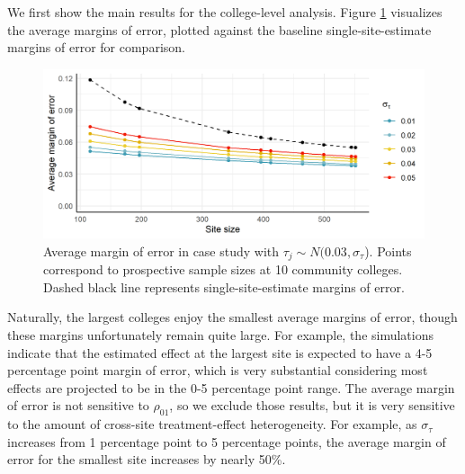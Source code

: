 \documentclass[]{article}
\begin{document}
We first show the main results for the college-level analysis.
Figure \ref{fig:case_study_moe} visualizes the average margins of error, plotted against the baseline single-site-estimate margins of error for comparison.
\begin{figure}[t]
    \centering
    \includegraphics[width=\textwidth]{case_study_moe.png}
    \caption{Average margin of error in case study with $\tau_j \sim N(0.03, \sigma_\tau$). Points correspond to prospective sample sizes at 10 community colleges. Dashed black line represents single-site-estimate margins of error.}
    \label{fig:case_study_moe}
\end{figure}
Naturally, the largest colleges enjoy the smallest average margins of error, though these margins unfortunately remain quite large.
For example, the simulations indicate that the estimated effect at the largest site is expected to have a 4-5 percentage point margin of error, which is very substantial considering most effects are projected to be in the 0-5 percentage point range.
The average margin of error is not sensitive to $\rho_{01}$, so we exclude those results, but it is very sensitive to the amount of cross-site treatment-effect heterogeneity.
For example, as $\sigma_\tau$ increases from 1 percentage point to 5 percentage points, the average margin of error for the smallest site increases by nearly 50\%.
\end{document}
